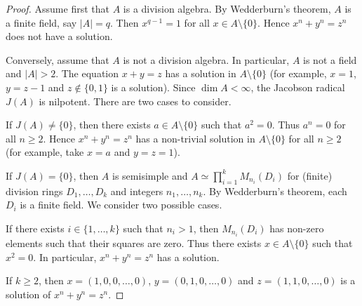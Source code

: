 \begin{proof}
    Assume first that $A$ is a division algebra. By Wedderburn's theorem, 
    $A$ is a finite field, say $|A|=q$. Then $x^{q-1}=1$ for all $x\in A\setminus\{0\}$.
    Hence $x^n+y^n=z^n$ does not have a solution. 
    
    Conversely, assume that $A$ is not a division algebra. In particular, 
    $A$ is not a field and $|A|>2$. The equation $x+y=z$ has a solution in $A\setminus\{0\}$ (for example, $x=1$, $y=z-1$ and $z\not\in\{0,1\}$ is a solution). Since
    $\dim A<\infty$, the Jacobson radical $J(A)$ is nilpotent. There are two 
    cases to consider. 
    
    If $J(A)\ne\{0\}$, 
    then there exists $a\in A\setminus\{0\}$ such that $a^2=0$. Thus $a^n=0$ 
    for all $n\geq2$. Hence $x^n+y^n=z^n$ has a non-trivial
    solution in $A\setminus\{0\}$ for all $n\geq2$ (for example, take 
    $x=a$ and $y=z=1$).
    
    If $J(A)=\{0\}$, then $A$ is semisimple and 
    $A\simeq\prod_{i=1}^k M_{n_i}(D_i)$ for (finite) division rings $D_1,\dots,D_k$
    and integers $n_1,\dots,n_k$. By Wedderburn's theorem, each $D_i$ is a finite
    field. We consider two possible cases. 
    
    If there exists $i\in\{1,\dots,k\}$ such that $n_i>1$, then
    $M_{n_i}(D_i)$ has non-zero elements such that their squares are zero. Thus 
    there exists $x\in A\setminus\{0\}$ such that $x^2=0$. In particular, 
    $x^n+y^n=z^n$ has a solution. 
    
    If $k\geq 2$, then $x=(1,0,0,\dots,0)$, $y=(0,1,0,\dots,0)$ 
    and $z=(1,1,0,\dots,0)$ is a solution of $x^n+y^n=z^n$.
\end{proof}
